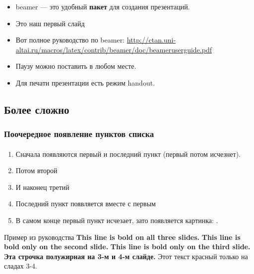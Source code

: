 \documentclass[t]{beamer}  %
\begin{document}
\begin{frame}
	\frametitle{\insertsection} 
	\framesubtitle{\insertsubsection}
	\begin{itemize}
		\item beamer ---  это \alert{удобный} \textbf{пакет} для создания презентаций.
		\item Это наш первый слайд \pause
		\item Вот полное руководство по beamer:  \href{http://ctan.uni-altai.ru/macros/latex/contrib/beamer/doc/beameruserguide.pdf}{http://ctan.uni-altai.ru/macros/latex/contrib/beamer/doc/beameruserguide.pdf} \pause
		\item Паузу можно поставить в любом \pause месте.
		\item Для печати презентации есть режим handout.
	\end{itemize}
\end{frame}

\subsection{Более сложно}

\begin{frame}
	\frametitle{Поочередное появление пунктов списка}
	\framesubtitle{\insertsubsection}
    \begin{enumerate}
        \item<1-5> Сначала появляются первый и последний пункт (первый потом исчезнет).
        \item<2-> Потом второй
        \item<3-> И наконец третий
        \item<1-> Последний пункт появляется вместе с первым
    	\item<6-> В самом конце первый пункт исчезает, зато появляется картинка: \insertlogo.
    \end{enumerate}
\end{frame}

\begin{frame}{Пример из руководства}
   \textbf{This line is bold on all three slides.}
   \textbf<2,5>{This line is bold only on the second slide.}
   \textbf<3>{This line is bold only on the third slide.}
   \textbf<3,4>{Эта строчка полужирная на 3-м и 4-м слайде.}
	 Этот текст красный только на сладах 3-4.
\end{frame}
\end{document}
